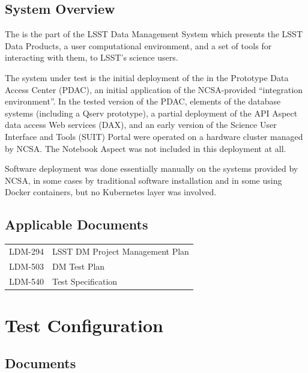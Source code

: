 \documentclass[DM,lsstdraft,STR,toc]{lsstdoc}
\begin{document}
\subsection{System Overview}
\label{sect:systemoverview}

The \product{} is the part of the LSST Data Management System which presents the LSST Data Products,
a user computational environment, and a set of tools for interacting with them, 
to LSST's science users.

The system under test is the initial deployment of the \product{} in the Prototype Data Access Center (PDAC),
an initial application of the NCSA-provided ``integration environment''.
In the tested version of the PDAC, 
elements of the database systems (including a Qserv prototype),
a partial deployment of the API Aspect data access Web services (DAX),
and an early version of the Science User Interface and Tools (SUIT) Portal were operated on a hardware cluster managed by NCSA.
The Notebook Aspect was not included in this deployment at all.

Software deployment was done essentially manually on the systems provided by NCSA,
in some cases by traditional software installation and in some using Docker containers,
but no Kubernetes layer was involved.

\subsection{Applicable Documents}
\label{sect:appdocs}

\begin{tabular}[htb]{l l}
LDM-294 & LSST DM Project Management Plan\\
LDM-503 & DM Test Plan\\
LDM-540 & \product{} Test Specification\\
\end{tabular}


\section{Test Configuration}

\subsection{Documents}
\end{document}

